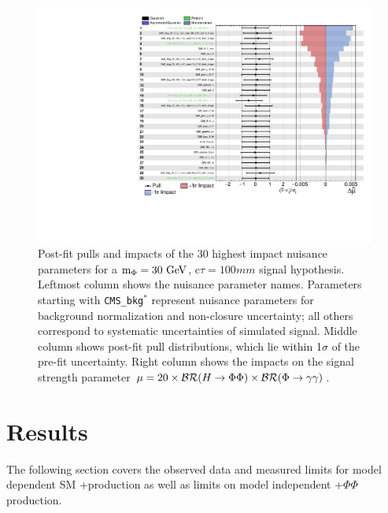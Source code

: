 \begin{figure}[htb!]
	\centering
	\includegraphics[width=\linewidth]{figs/05_analysis/impacts_postFit_m30_ct100.pdf}
	\caption[Post-fit pulls and impacts of the 30 highest impact nuisance parameters for a  $\mphi=30\unit{GeV}$, c$\tau=100\unit{mm}$ signal hypothesis. Leftmost column shows the nuisance parameter names. Parameters starting with \texttt{CMS\_bkg}$^*$ represent nuisance parameters for background normalization and non-closure uncertainty; all others correspond to systematic uncertainties of simulated signal. Middle column shows post-fit pull distributions, which lie within 1$\sigma$ of the pre-fit uncertainty. Right column shows the impacts on the signal strength parameter $\mu=20\times\mathcal{BR}(\VH\to\Phi\Phi)\times\mathcal{BR}(\Phi\to\gamma\gamma)$.]{Post-fit pulls and impacts of the 30 highest impact nuisance parameters for a  $\mphi=30\unit{GeV}$, c$\tau=100\unit{mm}$ signal hypothesis. Leftmost column shows the nuisance parameter names. Parameters starting with \texttt{CMS\_bkg}$^*$ represent nuisance parameters for background normalization and non-closure uncertainty; all others correspond to systematic uncertainties of simulated signal. Middle column shows post-fit pull distributions, which lie within 1$\sigma$ of the pre-fit uncertainty. Right column shows the impacts on the signal strength parameter $\mu=20\times\mathcal{BR}(\VH\to\Phi\Phi)\times\mathcal{BR}(\Phi\to\gamma\gamma)$.}
	\label{fig:impacts}
\end{figure}

\section{Results} \label{sec:ana_res}
The following section covers the observed data and measured limits for model dependent SM \VZ+\VH production as well as limits on model independent \VZ+$\Phi\Phi$ production.

